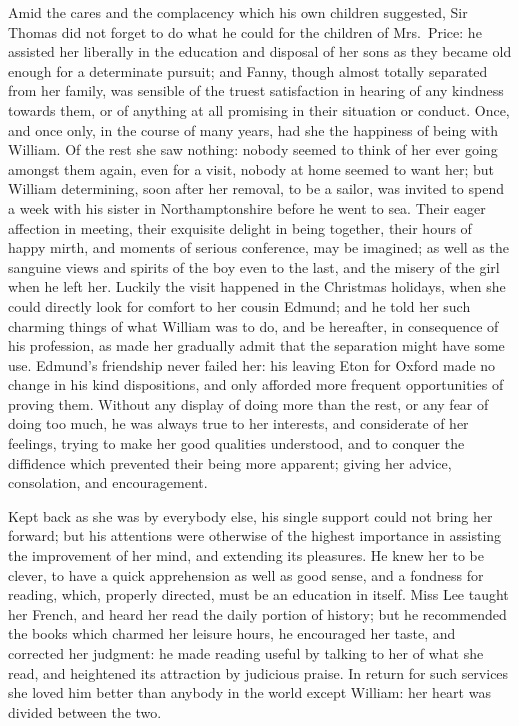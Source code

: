 \documentclass{article}
\begin{document}
Amid the cares and the complacency which his own
children suggested, Sir Thomas did not forget to do what
he could for the children of Mrs.\ Price:  he assisted
her liberally in the education and disposal of her sons
as they became old enough for a determinate pursuit;
and Fanny, though almost totally separated from her family,
was sensible of the truest satisfaction in hearing of any
kindness towards them, or of anything at all promising
in their situation or conduct.  Once, and once only,
in the course of many years, had she the happiness
of being with William.  Of the rest she saw nothing:
nobody seemed to think of her ever going amongst them again,
even for a visit, nobody at home seemed to want her;
but William determining, soon after her removal,
to be a sailor, was invited to spend a week with his
sister in Northamptonshire before he went to sea.
Their eager affection in meeting, their exquisite
delight in being together, their hours of happy mirth,
and moments of serious conference, may be imagined;
as well as the sanguine views and spirits of the boy even
to the last, and the misery of the girl when he left her.
Luckily the visit happened in the Christmas holidays,
when she could directly look for comfort to her cousin Edmund;
and he told her such charming things of what William was
to do, and be hereafter, in consequence of his profession,
as made her gradually admit that the separation might
have some use.  Edmund's friendship never failed her:
his leaving Eton for Oxford made no change in his kind
dispositions, and only afforded more frequent opportunities
of proving them.  Without any display of doing more than
the rest, or any fear of doing too much, he was always
true to her interests, and considerate of her feelings,
trying to make her good qualities understood, and to conquer
the diffidence which prevented their being more apparent;
giving her advice, consolation, and encouragement.

Kept back as she was by everybody else, his single support
could not bring her forward; but his attentions were otherwise
of the highest importance in assisting the improvement
of her mind, and extending its pleasures.  He knew her to
be clever, to have a quick apprehension as well as good sense,
and a fondness for reading, which, properly directed,
must be an education in itself.  Miss Lee taught her French,
and heard her read the daily portion of history; but he
recommended the books which charmed her leisure hours,
he encouraged her taste, and corrected her judgment:
he made reading useful by talking to her of what she read,
and heightened its attraction by judicious praise.
In return for such services she loved him better than
anybody in the world except William:  her heart was divided
between the two.
\end{document}
